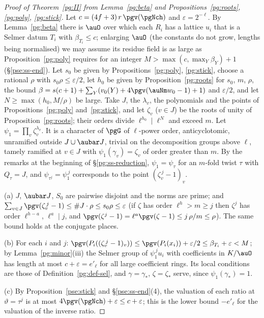\documentclass[10pt]{amsart}
\theoremstyle{definition}
\theoremstyle{remark}
\begin{document}
\begin{proof}[Proof of Theorem~\ref{pg:II} from Lemma~\ref{pg:beta} and
Propositions~\ref{pg:roots}, \ref{pg:poly}, \ref{pg:stick}]
Let $c=(4f+3)\,r\,\pgv(\pgNch)$ and $\varepsilon=2^{-\ell}$. By Lemma~\ref{pg:beta} there is
$\auO$ over which each $R_i$ has a lattice $u_i$ that is a Selmer datum $T_i$ with $\beta_{T_i}\le
c$; enlarging $\auO$ (the constants do not grow, lengths being normalised) we may assume its
residue field is as large as Proposition~\ref{pg:poly} requires for an integer $M>\max(c,\max_Y\beta_Y)+1$ (\S\ref{pse:ss-end}). Let $s_0$
be given by Propositions~\ref{pg:poly}, \ref{pg:stick}, choose a rational $\rho$ with
$s_0\rho\le\varepsilon/2$, let $h_0$ be given by Proposition~\ref{pg:roots} for $s_0$, $m$,
$\rho$, the bound $\beta=s(c+1)+\sum_Y(v_0(Y)+4\pgv(\auNm w_0-1)+1)$ and
$\varepsilon/2$, and let $N\ge\max(h_0,M/\rho)$ be large. Take $J$, the $\lambda_v$, the
polynomials and the points of Propositions~\ref{pg:poly} and~\ref{pg:stick}, and let
$\zeta_v$ ($v\in J$) be the roots of unity of Proposition~\ref{pg:roots}; their orders divide
$\ell^{h_0}\mid\ell^N$ and exceed $m$. Let $\psi_1=\prod_v\zeta_v^{\lambda_v}$. It is a character of
$\pgG$ of $\ell$-power order, anticyclotomic, unramified outside $J\cup\aubar J$, trivial on the
decomposition groups above $\ell$, tamely ramified at $v\in J$ with $\psi_1(\gamma_v)=\zeta_v$ of
order greater than $m$. By the remarks at the beginning of \S\ref{pg:ss-reduction},
$\psi_1=\psi_\tau$ for an $m$-fold twist $\tau$ with $Q_\tau=J$, and $\psi_{\tau^j}=\psi_1^{\,j}$
corresponds to the point $(\zeta_v^{\,j}-1)_v$.

(a) $J$, $\aubar J$, $S_0$ are pairwise disjoint and the norms are prime; and
$\sum_{v\in J}\pgv(\zeta_v^{\,j}-1)\le\#J\cdot\rho\le s_0\rho\le\varepsilon$ (if $\zeta$ has order $\ell^h>m\ge j$ then
$\zeta^j$ has order $\ell^{h-a}$, $\ell^a\mid j$, and $\pgv(\zeta^j-1)=\ell^a\pgv(\zeta-1)\le
j\,\rho/m\le\rho$). The same bound holds at the conjugate places.

(b) For each $i$ and $j$: $\pgv(P_i((\zeta_v^{\,j}-1)_v))\le\pgv(P_i(x_i))+\varepsilon/2\le
\beta_{T_i}+\varepsilon<M$; by Lemma~\ref{pg:minor}(iii) the Selmer group of $\psi_1^{\,j}u_i$ with
coefficients in $K/\auO$ has length at most $c+\varepsilon=e'_\ell$ for all large coefficient
rings. Its local conditions are those of Definition~\ref{pg:def-sel}, and $\gamma=\gamma_*$,
$\zeta=\zeta_*$ serve, since $\psi_1(\gamma_*)=1$.

(c) By Proposition~\ref{pse:stick} and \S\ref{pse:ss-end}(4), the valuation of each ratio at $\vartheta=\tau^j$ is at most $4\pgv(\pgNch)+\varepsilon\le c+\varepsilon$; this is the lower bound $-e'_\ell$ for the
valuation of the inverse ratio.
\end{proof}
\end{document}
